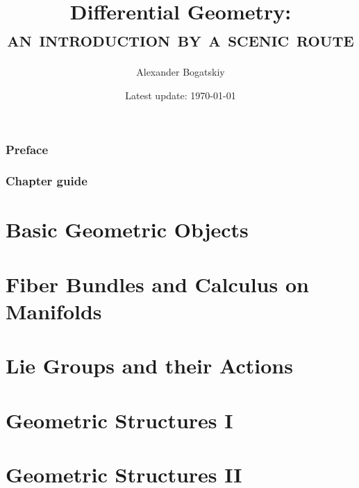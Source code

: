 \documentclass[english,a5paper]{book}%
\begin{document}
\title{
    {\Large{}Differential Geometry:}\\
    \textsc{an introduction by a scenic route}
    }
\author{Alexander Bogatskiy}
\date{Latest update: \today}

\maketitle

\tableofcontents{}

\clearpage
\printglossary[type=\acronymtype,title=Abbreviations,style=long,nonumberlist] %

\clearpage
\section*{Preface}


\clearpage
\section*{Chapter guide}



\part{Basic Geometric Objects}



\clearpage
\part{Fiber Bundles and Calculus on Manifolds}



\clearpage
\part{Lie Groups and their Actions}\label{part Lie group actions}



\clearpage
\part{Geometric Structures I}\label{Part Structured Geom I}



\clearpage
\part{Geometric Structures II}\label{Part Structured Geom II}

\end{document}
